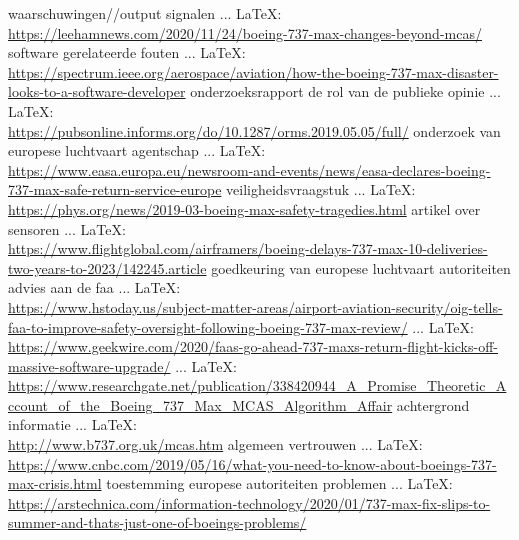 \begin{thebibliography}{99}
waarschuwingen//output signalen
 ... \LaTeX:\\ \url{https://leehamnews.com/2020/11/24/boeing-737-max-changes-beyond-mcas/}
software gerelateerde fouten
 ... \LaTeX:\\ \url{https://spectrum.ieee.org/aerospace/aviation/how-the-boeing-737-max-disaster-looks-to-a-software-developer}
onderzoeksrapport
de rol van de publieke opinie
 ... \LaTeX:\\ \url{https://pubsonline.informs.org/do/10.1287/orms.2019.05.05/full/}
onderzoek van europese luchtvaart agentschap
 ... \LaTeX:\\ \url{https://www.easa.europa.eu/newsroom-and-events/news/easa-declares-boeing-737-max-safe-return-service-europe}
veiligheidsvraagstuk
 ... \LaTeX:\\ \url{https://phys.org/news/2019-03-boeing-max-safety-tragedies.html}
artikel over sensoren
 ... \LaTeX:\\ \url{https://www.flightglobal.com/airframers/boeing-delays-737-max-10-deliveries-two-years-to-2023/142245.article}
goedkeuring van europese luchtvaart autoriteiten
advies aan de faa
 ... \LaTeX:\\ \url{https://www.hstoday.us/subject-matter-areas/airport-aviation-security/oig-tells-faa-to-improve-safety-oversight-following-boeing-737-max-review/}
 ... \LaTeX:\\ \url{https://www.geekwire.com/2020/faas-go-ahead-737-maxs-return-flight-kicks-off-massive-software-upgrade/}
 ... \LaTeX:\\ \url{https://www.researchgate.net/publication/338420944_A_Promise_Theoretic_Account_of_the_Boeing_737_Max_MCAS_Algorithm_Affair}
achtergrond informatie
 ... \LaTeX:\\ \url{http://www.b737.org.uk/mcas.htm}
algemeen vertrouwen
 ... \LaTeX:\\ \url{https://www.cnbc.com/2019/05/16/what-you-need-to-know-about-boeings-737-max-crisis.html}
toestemming europese autoriteiten
problemen
 ... \LaTeX:\\ \url{https://arstechnica.com/information-technology/2020/01/737-max-fix-slips-to-summer-and-thats-just-one-of-boeings-problems/}

\end{thebibliography}

